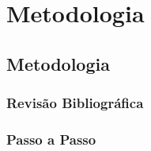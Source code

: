 \part{Metodologia}

\chapter[Metodologia]{Metodologia}



\section{Revisão Bibliográfica}



\section{Passo a Passo}

